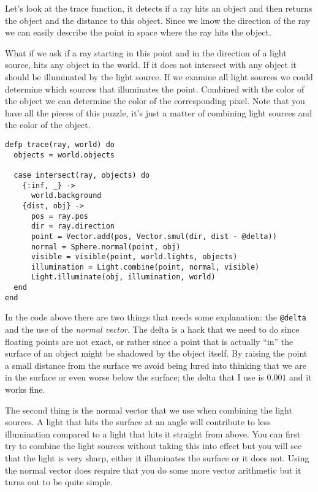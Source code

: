 \documentclass[a4paper,11pt]{article}
\begin{document}
Let's look at the trace function, it detects if a ray hits an object
and then returns the object and the distance to this object. Since we
know the direction of the ray we can easily describe the point in
space where the ray hits the object.

What if we ask if a ray starting in this point and in the direction of
a light source, hits any object in the world. If it does not intersect
with any object it should be illuminated by the light source. If we
examine all light sources we could determine which sources that
illuminates the point. Combined with the color of the object we can
determine the color of the corresponding pixel. Note that you
have all the pieces of this puzzle, it's just a matter of combining
light sources and the color of the object.

\pagebreak

\begin{verbatim}
defp trace(ray, world) do
  objects = world.objects

  case intersect(ray, objects) do
    {:inf, _} ->
      world.background
    {dist, obj} ->
      pos = ray.pos
      dir = ray.direction
      point = Vector.add(pos, Vector.smul(dir, dist - @delta))
      normal = Sphere.normal(point, obj)
      visible = visible(point, world.lights, objects)
      illumination = Light.combine(point, normal, visible)
      Light.illuminate(obj, illumination, world)
  end
end
\end{verbatim}

In the code above there are two things that needs some explanation:
the {\tt @delta} and the use of the {\em normal vector}. The delta is
a hack that we need to do since floating points are not exact, or
rather since a point that is actually ``in'' the surface of an object
might be shadowed by the object itself. By raising the point a small
distance from the surface we avoid being lured into thinking that we
are in the surface or even worse below the surface; the delta that I
use is $0.001$ and it works fine.

The second thing is the normal vector that we use when
combining the light sources. A light that hits the surface at an angle
will contribute to less illumination compared to a light that hits it
straight from above. You can first try to combine the light sources
without taking this into effect but you will see that the light is
very sharp, either it illuminates the surface or it does not. Using
the normal vector does require that you do some more vector
arithmetic but it turns out to be quite simple.
\end{document}
